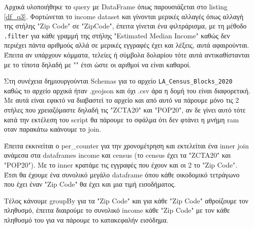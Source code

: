 \documentclass[12pt, a4paper]{article}
\begin{document}
Αρχικά υλοποιήθηκε το query με DataFrame όπως παρουσιάζεται στο listing \ref{df_q3}.
Φορτώνεται το income dataset και γίνονται μερικές αλλαγές όπως αλλαγή
της στήλης "Zip Code" σε "ZipCode", έπειτα γίνεται ένα φιλτράρισμα, με τη μέθοδο \texttt{.filter} 
για κάθε γραμμή
της στήλης "Estimated Median Income" καθώς δεν περιέχει πάντα αριθμούς αλλά σε
μερικές εγγραφές έχει και λέξεις, αυτά αφαιρούνται. Έπειτα αν υπάρχουν
κόμματα, τελείες ή σύμβολα δολαρίου τότε αυτά αντικαθίστανται με το τίποτα 
δηλαδή με "" έτσι ώστε οι αριθμοί να είναι καθαροί. 

Στη συνέχεια δημιουργούνται Schemas για το αρχείο \texttt{LA\_Census\_Blocks\_2020} καθώς
το αρχείο αρχικά ήταν .geojson και όχι .csv άρα η δομή του είναι διαφορετική. Με αυτά
είναι εφικτό να διαβαστεί το αρχείο και από αυτό να πάρουμε μόνο τις 2 στήλες που χρειαζόμαστε
δηλαδή τις "ZCTA20" και "POP20", αν δε γίνει αυτό τότε κατά την εκτέλεση του 
script θα πάρουμε το σφάλμα ότι δεν φτάνει η μνήμη ram οταν παρακάτω καάνουμε το join.

Έπειτα εκκινείται ο per\_counter για την χρονομέτρηση και εκτελείται ένα inner join 
ανάμεσα στα dataframes income και census (το census έχει τα "ZCTA20" και "POP20").
Με το inner κρατάμε τις εγγραφές που έχουν και οι 2 το "Zip Code". Έτσι θα έχουμε
ένα συνολικό μεγάλο dataframe όπου κάθε οικοδομικό τετράγωνο που έχει 
έναν "Zip Code" θα έχει και μια τιμή εισοδήματος. 

Τέλος κάνουμε groupBy για τα "Zip Code" και για κάθε "Zip Code" αθροίζουμε 
τον πληθυσμό, έπειτα διαιρούμε το συνολικό income κάθε "Zip Code" με τον
κάθε πληθυσμό του για να πάρουμε το κατακεφαλήν εισόδημα.
\end{document}
